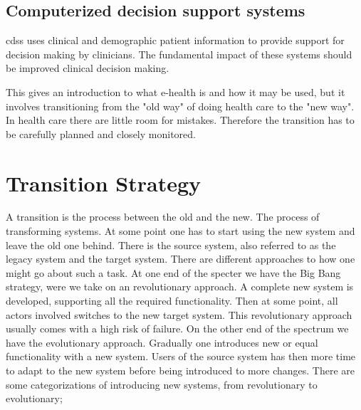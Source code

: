 \subsection{Computerized decision support systems}
\gls{cdss} uses clinical and demographic patient information to provide support for decision making by clinicians. The fundamental impact of these systems should be improved clinical decision making.


This gives an introduction to what e-health is and how it may be used, but it involves transitioning from the "old way" of doing health care to the "new way".
In health care there are little room for mistakes.
Therefore the transition has to be carefully planned and closely monitored.



\section{Transition Strategy}
A transition is the process between the old and the new.
The process of transforming systems.
At some point one has to start using the new system and leave the old one behind.
There is the source system, also referred to as the legacy system and the target
system. 
There are different approaches to how one might go about such a task.
At one end of the specter we have the Big Bang strategy, were we
take on an revolutionary approach. A complete new system is developed,
supporting all the required functionality. Then at some point, all actors involved switches to the new target system. This revolutionary approach usually comes with a high risk of failure. 
On the other end of the spectrum we have the evolutionary approach. 
Gradually one introduces new or equal functionality with a new system.
Users of the source system has then more time to adapt to the new system before being introduced to more changes.
There are some categorizations of introducing new systems, from revolutionary to evolutionary;

